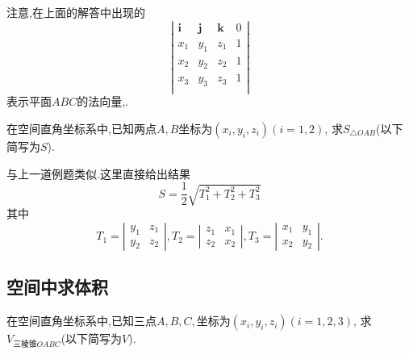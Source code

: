 注意,在上面的解答中出现的
$$
\left|
  \begin{array}{cccc}
    \bm{i}&\bm{j}&\bm{k}&0\\
    x_1&y_1&z_1&1\\
    x_2&y_2 &z_2&1\\
    x_3&y_3&z_3&1\\
  \end{array}
  \right|
$$
表示平面$ABC$的法向量,.

\prob 在空间直角坐标系中,已知两点$A,B
\textrm{坐标为}(x_i,y_i,z_i)(i=1,2)$,
求$S_{\triangle OAB}$(以下简写为$S$).

\sol 与上一道例题类似.这里直接给出结果
$$S=\frac{1}{2}\sqrt{T_1^2+T_2^2+T_3^2}$$
其中
$$
T_1=\left|\begin{array}{cc}
  y_1&z_1\\
  y_2&z_2
  \end{array}\right|
  ,
T_2=\left|\begin{array}{cc}
  z_1&x_1\\
  z_2&x_2
  \end{array}\right|
  ,
T_3=\left|\begin{array}{cc}
  x_1&y_1\\
  x_2&y_2
  \end{array}\right|
  .
$$ 
\solend

\subsection{空间中求体积}

\prob 在空间直角坐标系中,已知三点$A,B,C,
\textrm{坐标为}(x_i,y_i,z_i)(i=1,2,3)$,
求$V_{\textrm{三棱锥}OABC}$(以下简写为$V$).

